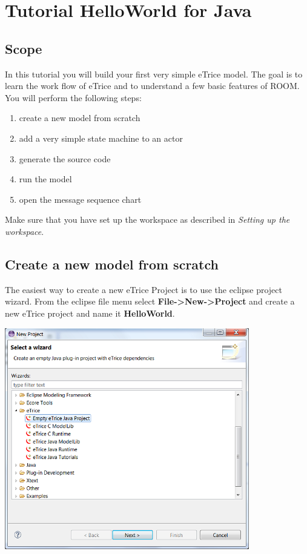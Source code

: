 \chapter{Tutorial HelloWorld for Java}

\section{Scope}

In this tutorial you will build your first very simple eTrice model. The goal is to learn the work flow of eTrice and to understand a few basic features of ROOM. You will perform the following steps:

\begin{enumerate}
\item create a new model from scratch
\item add a very simple state machine to an actor
\item generate the source code
\item run the model
\item open the message sequence chart
\end{enumerate}

Make sure that you have set up the workspace as described in \textit{Setting up the workspace}.

\section{Create a new model from scratch}

The easiest way to create a new eTrice Project is to use the eclipse project wizard. From the eclipse file menu select \textbf{File->New->Project} and create a new eTrice project and name it \textbf{HelloWorld}.

\includegraphics[width=0.8\textwidth]{images/015-HelloWorld10.png}

